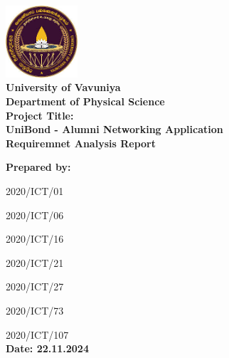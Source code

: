 \documentclass[a4paper,12pt]{article}
\begin{document}
\begin{titlepage}
    \begin{center}
        \includegraphics[width=0.2\textwidth]{uni_logo.jpeg} \\[1cm]
        
        \textbf{\LARGE University of Vavuniya} \\[0.5cm]
        \textbf{\Large Department of Physical Science} \\[1.5cm]
        
        \centering
        \vspace*{2cm} %
        {\Huge \textbf{Project Title:}}\\[1cm] %
        {\huge \textbf{UniBond - Alumni Networking Application}}\\[1cm] %
        {\Large \textbf{Requiremnet Analysis Report}}\\[1cm]
        \vspace*{1cm} %
        
        
        \textbf{\Large Prepared by:} \\[0.5cm]
        \item{\large 2020/ICT/01} \\[0.1cm]
        \item{\large 2020/ICT/06} \\[0.1cm]
        \item{\large 2020/ICT/16} \\[0.1cm]
        \item{\large 2020/ICT/21} \\[0.1cm]
        \item{\large 2020/ICT/27} \\[0.1cm]
        \item{\large 2020/ICT/73} \\[0.1cm]
        \item{\large 2020/ICT/107} \\[0.5cm]

        \vfill %
        \textbf{\large Date: 22.11.2024} \\
    \end{center}
\end{titlepage}
\end{document}
